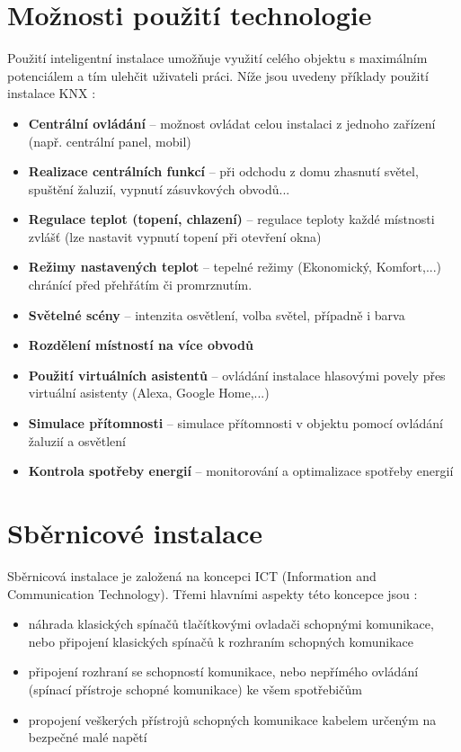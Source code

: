 \section{Možnosti použití technologie}
Použití inteligentní instalace umožňuje využití celého objektu s maximálním potenciálem a tím ulehčit uživateli práci. Níže jsou uvedeny příklady použití instalace KNX \cite{Systemove Argumenty}:
\begin{itemize}
    \item \textbf{Centrální ovládání} -- možnost ovládat celou instalaci z jednoho zařízení (např. centrální panel, mobil)
    \item \textbf{Realizace centrálních funkcí} -- při odchodu z domu zhasnutí světel, spuštění žaluzií, vypnutí zásuvkových obvodů...
    \item \textbf{Regulace teplot (topení, chlazení)} -- regulace teploty každé místnosti zvlášť (lze nastavit vypnutí topení při otevření okna)
    \item \textbf{Režimy nastavených teplot} -- tepelné režimy (Ekonomický, Komfort,...) chránící před přehřátím či promrznutím. 
    \item \textbf{Světelné scény} --  intenzita osvětlení, volba světel, případně i barva
    \item \textbf{Rozdělení místností na více obvodů}
    \item \textbf{Použití virtuálních asistentů} -- ovládání instalace hlasovými povely přes virtuální asistenty (Alexa, Google Home,...)
    \item \textbf{Simulace přítomnosti} -- simulace přítomnosti v objektu pomocí ovládání žaluzií a osvětlení
    \item \textbf{Kontrola spotřeby energií} -- monitorování a optimalizace spotřeby energií
\end{itemize}

\section{Sběrnicové instalace}
Sběrnicová instalace je založená na koncepci ICT (Information and Communication Technology). Třemi hlavními aspekty této koncepce jsou \cite{KNX principles}:
\begin{itemize}
\item náhrada klasických spínačů tlačítkovými ovladači schopnými komunikace, nebo připojení klasických spínačů k rozhraním schopných komunikace
\item připojení rozhraní se schopností komunikace, nebo nepřímého ovládání (spínací přístroje schopné komunikace) ke všem spotřebičům
\item propojení veškerých přístrojů schopných komunikace kabelem určeným na bezpečné malé napětí
\end{itemize}
